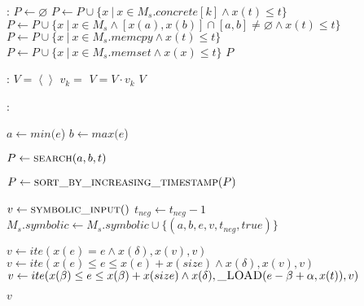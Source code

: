\documentclass{article}
\let\emptyset\varnothing
\begin{document}
\begin{algorithm}
  \bigskip

  \begin{algorithmic}[1]
	:
		\State $P \leftarrow \emptyset$
			\State $P \leftarrow P \cup \{x~|~x \in M_s.concrete[k] \wedge x(t) \le  t\}$
		\EndFor
		\State $P \leftarrow P \cup \{x~|~x \in M_s \wedge [x(a),x(b)] \cap[a, b] \neq \emptyset \wedge x(t) \le t\}$
		\State $P \leftarrow P \cup \{x~|~x \in M_s.memcpy \wedge x(t) \le t\}$
		\State $P \leftarrow P \cup \{x~|~x \in M_s.memset \wedge x(x) \le t\}$
		\State \Return $P$
	\EndFunction
  \end{algorithmic}

\end{algorithm}

\begin{algorithm}

  \begin{algorithmic}[1]
	:
		\State $V = \left\langle \right\rangle$ 
			\State $v_k = $ 
			\State $V = V \cdot v_k$
		\EndFor
		\State \Return $V$
	\EndFunction
  \end{algorithmic}

  \bigskip

  \begin{algorithmic}[1]
	:

		\State $a \leftarrow min(e$)
		\State $b \leftarrow max(e$)

		\State $P \leftarrow \Call{search}{a, b, t}$

		\State $P \leftarrow \Call{sort\_by\_increasing\_timestamp}{P}$

		\State $v \leftarrow \Call{symbolic\_input}$ 
		\State $t_{neg} \leftarrow t_{neg} - 1$
		\State $M_s.symbolic \leftarrow M_s.symbolic \cup \{(a, b, e, v, t_{neg}, true)\}$ 

				\State $v \leftarrow ite(x(e) = e \wedge x(\delta), x(v), v)$
				\State $v \leftarrow ite(x(e) \le e \le x(e) + x(size) \wedge x(\delta), x(v), v)$
				\State $v \leftarrow ite(x(\beta) \le e \le x(\beta) + x(size) \wedge x(\delta), \Call{\_LOAD}{e -  \beta + \alpha, x(t)}, v)$
			\EndIf
		\EndFor

		\State \Return $v$
	\EndFunction
  \end{algorithmic}
	

\end{algorithm}
\end{document}
